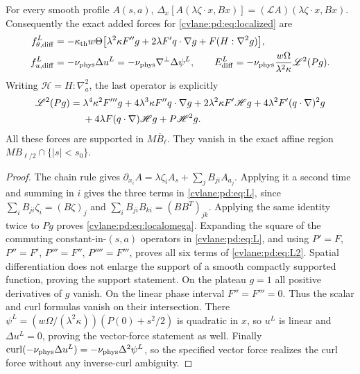 \begin{cvlanepdproposition}\label{cvlane:pd:prop:localized}
For every smooth profile $A(s,a)$,
$\Delta_x[A(\lambda\zeta\cdot x,Bx)]=
(\mathscr L A)(\lambda\zeta\cdot x,Bx)$.
Consequently the exact added forces for \eqref{cvlane:pd:eq:localized} are
\begin{align}
 f^L_{\theta,\mathrm{diff}}
 &=-\kappa_{\rm th} w\Theta\big[
 \lambda^2\kappa F''g+2\lambda F' q\cdot\nabla g
                         +F(H:\nabla^2g)\big],\label{cvlane:pd:eq:localtheta}\\
 f^L_{u,\mathrm{diff}}&=-\nu_{\rm phys}\Delta u^L
 =-\nu_{\rm phys}\nabla^\perp\Delta\psi^L,
 \qquad
 E^L_{\mathrm{diff}}=-\nu_{\rm phys}\frac{w\Omega}{\lambda^2\kappa}
       \mathscr L^2(Pg).\label{cvlane:pd:eq:localomega}
\end{align}
Writing $\mathscr H=H:\nabla_a^2$, the last operator is explicitly
\begin{align}\label{cvlane:pd:eq:L2}
 \mathscr L^2(Pg)={}&
 \lambda^4\kappa^2 F'''g
 +4\lambda^3\kappa F''q\cdot\nabla g
 +2\lambda^2\kappa F'\mathscr H g
 +4\lambda^2F'(q\cdot\nabla)^2g\notag\\
 &+4\lambda F(q\cdot\nabla)\mathscr H g
 +P\mathscr H^2g.
\end{align}
All these forces are supported in $M\overline B_\ell$. They vanish in
the exact affine region $M B_{\ell/2}\cap\{|s|<s_0\}$.
\end{cvlanepdproposition}
\begin{proof}
The chain rule gives
$\partial_{x_i}A=\lambda\zeta_i A_s+
\sum_jB_{ji}A_{a_j}$. Applying it a second time and summing in $i$
gives the three terms in \eqref{cvlane:pd:eq:L}, since
$\sum_i B_{ji}\zeta_i=(B\zeta)_j$ and
$\sum_iB_{ji}B_{ki}=(BB^T)_{jk}$. Applying the same identity twice to
$Pg$ proves \eqref{cvlane:pd:eq:localomega}. Expanding the square of the
commuting constant-in-$(s,a)$ operators in \eqref{cvlane:pd:eq:L}, and using
$P'=F$, $P''=F'$, $P'''=F''$, $P''''=F'''$, proves all six terms
of \eqref{cvlane:pd:eq:L2}.
Spatial differentiation does not enlarge the support of a smooth
compactly supported function, proving the support statement.
On the plateau $g=1$ all positive derivatives of $g$ vanish.
On the linear phase interval $F''=F'''=0$. Thus the scalar and curl
formulas vanish on their intersection. There
$\psi^L=(w\Omega/(\lambda^2\kappa))(P(0)+s^2/2)$ is quadratic in $x$,
so $u^L$ is linear and $\Delta u^L=0$, proving the vector-force statement
as well. Finally $\operatorname{curl}(-\nu_{\rm phys}\Delta u^L)
=-\nu_{\rm phys}\Delta^2\psi^L$, so the specified vector force realizes the
curl force without any inverse-curl ambiguity.
\end{proof}

